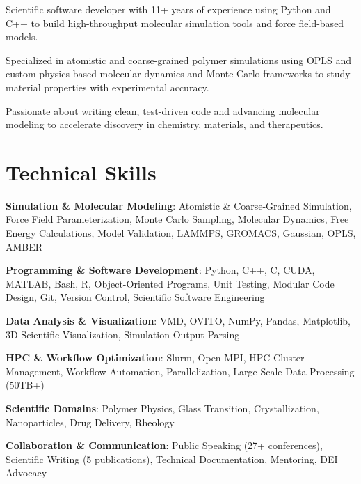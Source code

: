 \documentclass[letterpaper,12pt]{article}
\begin{document}
\begin{tabitemize}
  \item Scientific software developer with 11+ years of experience using Python and C++ to build high-throughput molecular simulation tools and force field-based models.
  \item Specialized in atomistic and coarse-grained polymer simulations using OPLS and custom physics-based molecular dynamics and Monte Carlo frameworks to study material properties with experimental accuracy.
  \item Passionate about writing clean, test-driven code and advancing molecular modeling to accelerate discovery in chemistry, materials, and therapeutics.
\end{tabitemize}

\section*{Technical Skills}
\begin{tabitemize}
  \item \textbf{Simulation \& Molecular Modeling}: Atomistic \& Coarse-Grained Simulation, Force Field Parameterization, Monte Carlo Sampling, Molecular Dynamics, Free Energy Calculations, Model Validation, LAMMPS, GROMACS, Gaussian, OPLS, AMBER
  \item \textbf{Programming \& Software Development}: Python, C++, C, CUDA, MATLAB, Bash, R, Object-Oriented Programs, Unit Testing, Modular Code Design, Git, Version Control, Scientific Software Engineering
  \item \textbf{Data Analysis \& Visualization}: VMD, OVITO, NumPy, Pandas, Matplotlib, 3D Scientific Visualization, Simulation Output Parsing
  \item \textbf{HPC \& Workflow Optimization}: Slurm, Open MPI, HPC Cluster Management, Workflow Automation, Parallelization, Large-Scale Data Processing (50TB+)
  \item \textbf{Scientific Domains}: Polymer Physics, Glass Transition, Crystallization, Nanoparticles, Drug Delivery, Rheology
  \item \textbf{Collaboration \& Communication}: Public Speaking (27+ conferences), Scientific Writing (5 publications), Technical Documentation, Mentoring, DEI Advocacy
\end{tabitemize}
\end{document}
